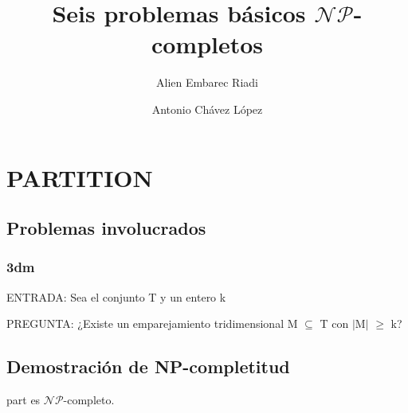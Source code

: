 \documentclass[11pt, a4paper]{memoir}
\title{\Huge Seis problemas básicos $\mathcal{NP}$-completos}
\author{Alien Embarec Riadi}
\author{Antonio Chávez López}
\affil{Grado en Ingeniería Informática. Universidad de La Laguna}
\begin{document}
\maketitle

\chapter{PARTITION}

\section{Problemas involucrados}

\subsection*{\gls{3dm}}

\noindent ENTRADA: Sea el conjunto T y un entero k 

\noindent PREGUNTA: ¿Existe un emparejamiento tridimensional M $\subseteq$ T con $\mid$M$\mid$ $\geq$ k? 


\section{Demostración de NP-completitud}

\begin{thm}
	\gls{part} es $\mathcal{NP}$-completo.
\end{thm}
\end{document}
